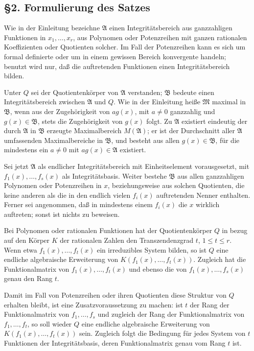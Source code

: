 \documentclass[11pt]{article}
\providecommand{\frakA}{\mathfrak A}
\providecommand{\frakB}{\mathfrak B}
\providecommand{\frakM}{\mathfrak M}
\begin{document}
\subsection*{§2. Formulierung des Satzes}

Wie in der Einleitung bezeichne \(\frakA\) einen Integritätsbereich aus ganzzahligen Funktionen in \(x_1,\ldots,x_r\), aus Polynomen oder Potenzreihen mit ganzen rationalen Koeffizienten oder Quotienten solcher. Im Fall der Potenzreihen kann es sich um formal definierte oder um in einem gewissen Bereich konvergente handeln; benutzt wird nur, daß die auftretenden Funktionen einen Integritätsbereich bilden.

Unter \(Q\) sei der Quotientenkörper von \(\frakA\) verstanden; \(\frakB\) bedeute einen Integritätsbereich zwischen \(\frakA\) und \(Q\). Wie in der Einleitung heiße \(\frakM\) maximal in \(\frakB\), wenn aus der Zugehörigkeit von \(a g(x)\), mit \(a\ne0\) ganzzahlig und \(g(x)\in\frakB\), stets die Zugehörigkeit von \(g(x)\) folgt. Zu \(\frakA\) existiert eindeutig der durch \(\frakA\) in \(\frakB\) erzeugte Maximalbereich \(M(\frakA)\); er ist der Durchschnitt aller \(\frakA\) umfassenden Maximalbereiche in \(\frakB\), und besteht aus allen \(g(x)\in\frakB\), für die mindestens ein \(a\ne0\) mit \(a g(x)\in\frakA\) existiert.

Sei jetzt \(\frakA\) als endlicher Integritätsbereich mit Einheitselement vorausgesetzt, mit \(f_1(x),\ldots,f_s(x)\) als Integritätsbasis. Weiter bestehe \(\frakB\) aus allen ganzzahligen Polynomen oder Potenzreihen in \(x\), beziehungsweise aus solchen Quotienten, die keine anderen als die in den endlich vielen \(f_i(x)\) auftretenden Nenner enthalten. Ferner sei angenommen, daß in mindestens einem \(f_i(x)\) die \(x\) wirklich auftreten; sonst ist nichts zu beweisen.

Bei Polynomen oder rationalen Funktionen hat der Quotientenkörper \(Q\) in bezug auf den Körper \(K\) der rationalen Zahlen den Transzendenzgrad \(t\), \(1\le t\le r\). Wenn etwa \(f_1(x),\ldots,f_t(x)\) ein irreduzibles System bilden, so ist \(Q\) eine endliche algebraische Erweiterung von \(K(f_1(x),\ldots,f_t(x))\). Zugleich hat die Funktionalmatrix von \(f_1(x),\ldots,f_t(x)\) und ebenso die von \(f_1(x),\ldots,f_s(x)\) genau den Rang \(t\).

Damit im Fall von Potenzreihen oder ihren Quotienten diese Struktur von \(Q\) erhalten bleibt, ist eine Zusatzvoraussetzung zu machen: ist \(t\) der Rang der Funktionalmatrix von \(f_1,\ldots,f_s\) und zugleich der Rang der Funktionalmatrix von \(f_1,\ldots,f_t\), so soll wieder \(Q\) eine endliche algebraische Erweiterung von \(K(f_1(x),\ldots,f_t(x))\) sein. Zugleich folgt die Bedingung für jedes System von \(t\) Funktionen der Integritätsbasis, deren Funktionalmatrix genau vom Rang \(t\) ist.
\end{document}
